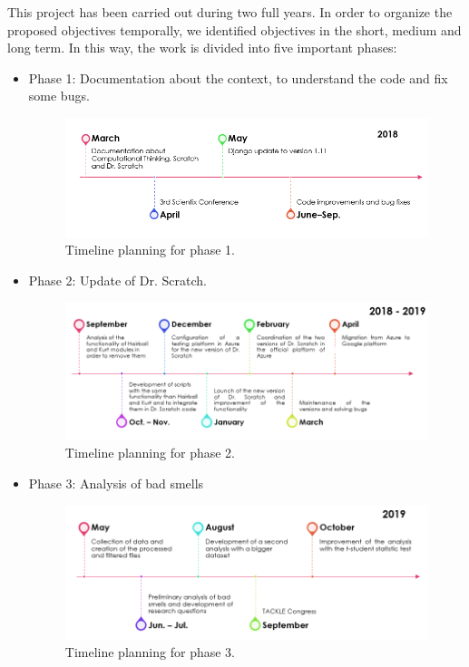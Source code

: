This project has been carried out during two full years. In order to organize the proposed objectives temporally, we identified objectives in the short, medium and long term. In this way, the work is divided into five important phases:

\begin{itemize}
    \item Phase 1: Documentation about the context, to understand the code and fix some bugs.
    
    \begin{figure}[h]
    \centering
        \includegraphics[width=12cm, keepaspectratio]{img/phase_1.png}
        \caption{Timeline planning for phase 1.}
        \label{fig:phase_1}
    \end{figure}

    \item Phase 2: Update of Dr. Scratch.
    
    \begin{figure}[h]
    \centering
        \includegraphics[width=15cm, keepaspectratio]{img/phase_2.png}
        \caption{Timeline planning for phase 2.}
        \label{fig:phase_2}
    \end{figure}
    
    \item Phase 3: Analysis of bad smells
    
    \begin{figure}[h]
    \centering
        \includegraphics[width=12cm, keepaspectratio]{img/phase_3.png}
        \caption{Timeline planning for phase 3.}
        \label{fig:phase_3}
    \end{figure}
    

\end{itemize}
